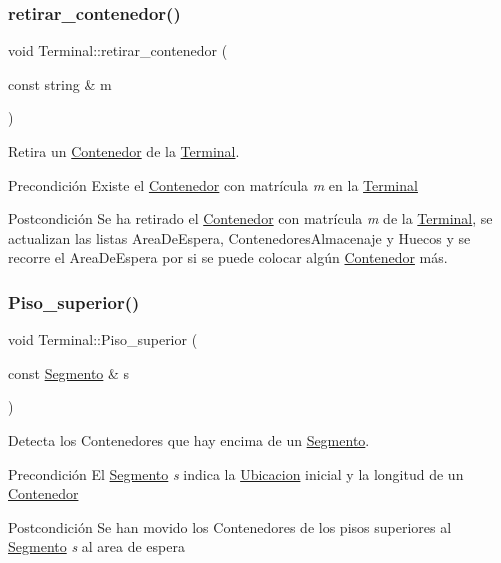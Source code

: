 \subsubsection{\texorpdfstring{retirar\+\_\+contenedor()}{retirar\_contenedor()}}
{\footnotesize\ttfamily void Terminal\+::retirar\+\_\+contenedor (\begin{DoxyParamCaption}\item[{const string \&}]{m }\end{DoxyParamCaption})}



Retira un \hyperlink{class_contenedor}{Contenedor} de la \hyperlink{class_terminal}{Terminal}. 

\begin{DoxyPrecond}{Precondición}
Existe el \hyperlink{class_contenedor}{Contenedor} con matrícula {\itshape m} en la \hyperlink{class_terminal}{Terminal} 
\end{DoxyPrecond}
\begin{DoxyPostcond}{Postcondición}
Se ha retirado el \hyperlink{class_contenedor}{Contenedor} con matrícula {\itshape m} de la \hyperlink{class_terminal}{Terminal}, se actualizan las listas Area\+De\+Espera, Contenedores\+Almacenaje y Huecos y se recorre el Area\+De\+Espera por si se puede colocar algún \hyperlink{class_contenedor}{Contenedor} más. 
\end{DoxyPostcond}
\mbox{\label{class_terminal_a122e5521bd57ee9ac07db30f5f82a346}} 
\subsubsection{\texorpdfstring{Piso\+\_\+superior()}{Piso\_superior()}}
{\footnotesize\ttfamily void Terminal\+::\+Piso\+\_\+superior (\begin{DoxyParamCaption}\item[{const \hyperlink{class_segmento}{Segmento} \&}]{s }\end{DoxyParamCaption})}



Detecta los Contenedores que hay encima de un \hyperlink{class_segmento}{Segmento}. 

\begin{DoxyPrecond}{Precondición}
El \hyperlink{class_segmento}{Segmento} {\itshape s} indica la \hyperlink{class_ubicacion}{Ubicacion} inicial y la longitud de un \hyperlink{class_contenedor}{Contenedor} 
\end{DoxyPrecond}
\begin{DoxyPostcond}{Postcondición}
Se han movido los Contenedores de los pisos superiores al \hyperlink{class_segmento}{Segmento} {\itshape s} al area de espera 
\end{DoxyPostcond}
\mbox{\label{class_terminal_a6e7268ad5b0ffbf1484f1f1522e800f0}} 
